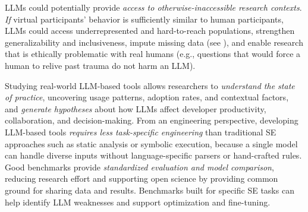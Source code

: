LLMs could potentially provide \emph{access to otherwise-inaccessible research contexts}. \textit{If} virtual participants' behavior is sufficiently similar to human participants, LLMs could access underrepresented and hard-to-reach populations, strengthen generalizability and inclusiveness, impute missing data (see \synthesis), and enable research that is ethically problematic with real humans (e.g., questions that would force a human to relive past trauma do not harm an LLM).

Studying real-world LLM-based tools allows researchers to \emph{understand the state of practice}, uncovering usage patterns, adoption rates, and contextual factors, and \emph{generate hypotheses} about how LLMs affect developer productivity, collaboration, and decision-making. From an engineering perspective, developing LLM-based tools \emph{requires less task-specific engineering} than traditional SE approaches such as static analysis or symbolic execution, because a single model can handle diverse inputs without language-specific parsers or hand-crafted rules. Good benchmarks provide \emph{standardized evaluation and model comparison}, reducing research effort and supporting open science by providing common ground for sharing data and results. Benchmarks built for specific SE tasks can help identify LLM weaknesses and support optimization and fine-tuning.



